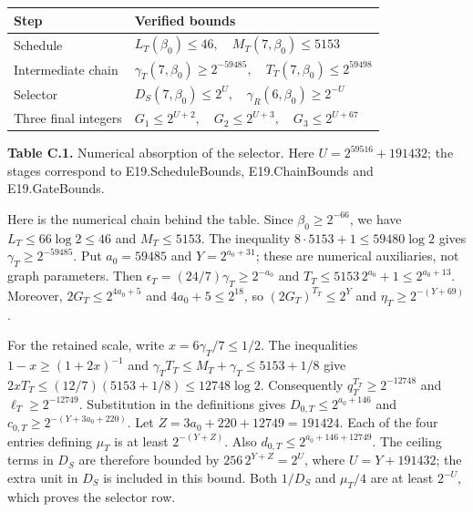 \documentclass[english,11pt,a4paper]{article}
\newcounter{none}
\begin{document}

{\def\LTcaptype{none} %
\begin{longtable}[c]{@{}
  >{\raggedright\arraybackslash}p{}
  >{\raggedright\arraybackslash}p{}@{}}
\toprule\noalign{}
\begin{minipage}[b]{\linewidth}\raggedright
Step
\end{minipage} & \begin{minipage}[b]{\linewidth}\raggedright
Verified bounds
\end{minipage} \\
\midrule\noalign{}
\endhead
\bottomrule\noalign{}
\endlastfoot
Schedule & \(L_T(\beta_0)\le46,\quad M_T(7,\beta_0)\le5153\) \\
Intermediate chain & \(\gamma_T(7,\beta_0)\ge2^{-59485},\quad T_T(7,\beta_0)\le2^{59498}\) \\
Selector & \(D_S(7,\beta_0)\le2^U,\quad \gamma_R(6,\beta_0)\ge2^{-U}\) \\
Three final integers & \(G_1\le2^{U+2},\quad G_2\le2^{U+3},\quad G_3\le2^{U+67}\) \\
\end{longtable}
}

\textbf{Table C.1.} Numerical absorption of the selector. Here \(U=2^{59516}+191432\); the stages correspond to {\ttfamily\small E19.\discretionary{\hbox{\ensuremath{\hookrightarrow}}}{}{}ScheduleBoun\discretionary{\hbox{\ensuremath{\hookrightarrow}}}{}{}ds}, {\ttfamily\small E19.\discretionary{\hbox{\ensuremath{\hookrightarrow}}}{}{}ChainBounds} and {\ttfamily\small E19.\discretionary{\hbox{\ensuremath{\hookrightarrow}}}{}{}GateBounds}.

Here is the numerical chain behind the table. Since \(\beta_0\ge2^{-66}\), we have \(L_T\le66\log2\le46\) and \(M_T\le5153\). The inequality \(8\cdot5153+1\le59480\log2\) gives \(\gamma_T\ge2^{-59485}\). Put \(a_0=59485\) and \(Y=2^{a_0+31}\); these are numerical auxiliaries, not graph parameters. Then \(\epsilon_T=(24/7)\gamma_T\ge2^{-a_0}\) and \(T_T\le5153\,2^{a_0}+1\le2^{a_0+13}\). Moreover, \(2G_T\le2^{4a_0+5}\) and \(4a_0+5\le2^{18}\), so \((2G_T)^{T_T}\le2^Y\) and \(\eta_T\ge2^{-(Y+69)}\).

For the retained scale, write \(x=6\gamma_T/7\le1/2\). The inequalities \(1-x\ge(1+2x)^{-1}\) and \(\gamma_TT_T\le M_T+\gamma_T\le5153+1/8\) give \(2xT_T\le(12/7)(5153+1/8)\le12748\log2\). Consequently \(q_T^{T_T}\ge2^{-12748}\) and \(\ell_T\ge2^{-12749}\). Substitution in the definitions gives \(D_{0,T}\le2^{a_0+146}\) and \(c_{0,T}\ge2^{-(Y+3a_0+220)}\). Let \(Z=3a_0+220+12749=191424\). Each of the four entries defining \(\mu_T\) is at least \(2^{-(Y+Z)}\). Also \(d_{0,T}\le2^{a_0+146+12749}\). The ceiling terms in \(D_S\) are therefore bounded by \(256\,2^{Y+Z}=2^U\), where \(U=Y+191432\); the extra unit in \(D_S\) is included in this bound. Both \(1/D_S\) and \(\mu_T/4\) are at least \(2^{-U}\), which proves the selector row.
\end{document}
